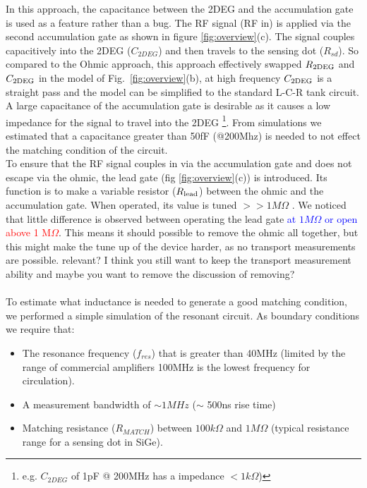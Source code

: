 \documentclass[twocolumn]{article}
\begin{document}
	
	In this approach, the capacitance between the 2DEG and the accumulation gate is used as a feature rather than a bug.  The RF signal (RF in) is applied via the second accumulation gate as shown in figure \ref{fig:overview}(c).  The signal couples capacitively into the 2DEG ($C_{2DEG}$) and then travels to the sensing dot ($R_{sd}$). \color{red} So compared to the Ohmic approach, this approach effectively swapped $R_{\rm 2DEG}$ and $C_{\rm 2DEG}$ in the model of Fig.\ \ref{fig:overview}(b), at high frequency $C_{\rm 2DEG}$ is a straight pass and the model can be simplified to the standard L-C-R tank circuit. \color{black} A large capacitance of the accumulation gate is desirable as it causes a low impedance for the signal to travel into the 2DEG \footnote{e.g. $C_{2DEG}$ of 1pF @ 200MHz has a impedance $< 1k\Omega$)}. From simulations we estimated that a capacitance greater than 50fF (@200Mhz) is needed to not effect the matching condition of the circuit.
	\\
	To ensure that the RF signal couples in via the accumulation gate and does not escape via the ohmic, the lead gate (fig \ref{fig:overview}(c)) is introduced.
	Its function is to make a variable resistor ($R_{\rm lead}$) between the ohmic and the accumulation gate.
	When operated, its value is tuned $>>1M\Omega$ . We noticed that little difference is observed between operating the lead gate \textcolor{blue}{at $1M\Omega$ or open} \textcolor{red}{above 1 M$\Omega$}. This means it should possible to remove the ohmic all together, but this might make the tune up of the device harder, as no transport measurements are possible. \color{blue}relevant? \color{red}I think you still want to keep the transport measurement ability and maybe you want to remove the discussion of removing?\color{black}
	\\ \\
	To estimate what inductance is needed to generate a good matching condition, we performed a simple simulation of the resonant circuit. As boundary conditions we require that:
	\begin{itemize}
		\item The resonance frequency ($f_{res}$) that is greater than 40MHz (limited by the range of commercial amplifiers \color{red}100MHz is the lowest frequency for circulation\color{black}).
		\item A measurement bandwidth of $\sim 1MHz$ ($\sim$ 500ns rise time)
		\item Matching resistance ($R_{MATCH}$) between $100k\Omega$ and $1M\Omega$ (typical resistance range for a sensing dot in SiGe).
	\end{itemize}
\end{document}
